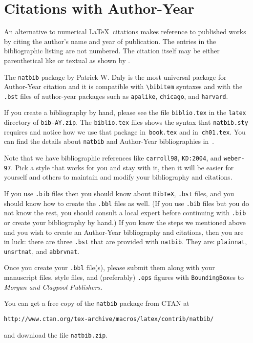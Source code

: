 
\chapter{Citations with Author-Year}
\label{chap:cit:A-Y}

An alternative to numerical \LaTeX\ citations makes reference to published
works by citing the author's name and year of publication. The entries in 
the bibliographic listing are not numbered. The citation itself may be 
either parenthetical like \citep{carroll98} or textual as shown by
\citet{carroll98}.

The \verb+natbib+ package by Patrick W. Daly is the most universal package
for Author-Year citation and it is compatible with \verb+\bibitem+ syntaxes
and with the \verb+.bst+ files of author-year packages such as
\verb+apalike+, \verb+chicago+, and \verb+harvard+.

If you create a bibliography by hand, please see the file \verb+biblio.tex+
in the \verb+latex+ directory of \verb+bib-AY.zip+.
The \verb+biblio.tex+ files shows the syntax that \verb+natbib.sty+ 
requires and notice how we use
that package in~\verb+book.tex+ and in~\verb+ch01.tex+. 
You can find the details about \verb+natbib+ and Author-Year bibliographies
in~\citet[pages~218-221]{KD:2004}.

Note that we have bibliographic references like \verb+carroll98+,
\verb+KD:2004+, and \verb+weber-97+. Pick a style that works for you
and stay with it, then it will be easier for yourself and others to 
maintain and modify your bibliography and citations.

If you use \verb+.bib+ files then you should know about \verb+BibTeX+,
\verb+.bst+ files, and you should know how to create the \verb+.bbl+
files as well.
(If you use \verb+.bib+ files but you do not know the rest, you should
consult a local expert before continuing with \verb+.bib+ or create
your bibliography by hand.)
If you know the steps we mentioned above and you wish to create an 
Author-Year bibliography and citations, then you are in luck: 
there are three \verb+.bst+ that are provided with \verb+natbib+.
They are: \verb+plainnat+, \verb+unsrtnat+, and \verb+abbrvnat+.

Once you create your \verb+.bbl+ file(s), please submit them along with
your manuscript files, style files, and (preferably) \verb+.eps+ figures with 
\verb+BoundingBox+es to \textit{Morgan and Claypool Publishers.}

You can get a free copy of the \verb+natbib+ package  from CTAN at
\begin{center}
\verb+http://www.ctan.org/tex-archive/macros/latex/contrib/natbib/+
\end{center}
and download the file \verb+natbib.zip+.

